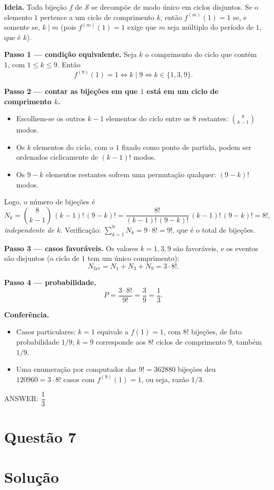 \documentclass{article}%
\begin{document}
\textbf{Ideia.} Toda bijeção $f$ de $\mathcal S$ se decompõe de modo único em ciclos disjuntos. Se o elemento $1$ pertence a um ciclo de comprimento $k$, então $f^{(m)}(1)=1$ se, e somente se, $k\mid m$ (pois $f^{(m)}(1)=1$ exige que $m$ seja múltiplo do período de $1$, que é $k$).

\textbf{Passo 1 --- condição equivalente.} Seja $k$ o comprimento do ciclo que contém $1$, com $1\le k\le 9$. Então
\[
f^{(9)}(1)=1 \iff k\mid 9 \iff k\in\{1,3,9\}.
\]

\textbf{Passo 2 --- contar as bijeções em que $1$ está em um ciclo de comprimento $k$.}
\begin{itemize}
\item Escolhem-se os outros $k-1$ elementos do ciclo entre os $8$ restantes: $\binom{8}{k-1}$ modos.
\item Os $k$ elementos do ciclo, com o $1$ fixado como ponto de partida, podem ser ordenados ciclicamente de $(k-1)!$ modos.
\item Os $9-k$ elementos restantes sofrem uma permutação qualquer: $(9-k)!$ modos.
\end{itemize}
Logo, o número de bijeções é
\[
N_k=\binom{8}{k-1}\,(k-1)!\,(9-k)!=\frac{8!}{(k-1)!\,(9-k)!}\,(k-1)!\,(9-k)!=8!,
\]
\emph{independente de $k$}. Verificação: $\sum_{k=1}^{9}N_k=9\cdot 8!=9!$, que é o total de bijeções.

\textbf{Passo 3 --- casos favoráveis.} Os valores $k=1,3,9$ são favoráveis, e os eventos são disjuntos (o ciclo de $1$ tem um único comprimento):
\[
N_{\text{fav}}=N_1+N_3+N_9=3\cdot 8!.
\]

\textbf{Passo 4 --- probabilidade.}
\[
P=\frac{3\cdot 8!}{9!}=\frac{3}{9}=\frac13 .
\]

\textbf{Conferência.}
\begin{itemize}
\item Casos particulares: $k=1$ equivale a $f(1)=1$, com $8!$ bijeções, de fato probabilidade $1/9$; $k=9$ corresponde aos $8!$ ciclos de comprimento $9$, também $1/9$.
\item Uma enumeração por computador das $9!=362880$ bijeções deu $120960=3\cdot 8!$ casos com $f^{(9)}(1)=1$, ou seja, razão $1/3$.
\end{itemize}

ANSWER: $\dfrac{1}{3}$%
\newpage%
\section*{Questão 7}

\section*{Solução}
\end{document}
